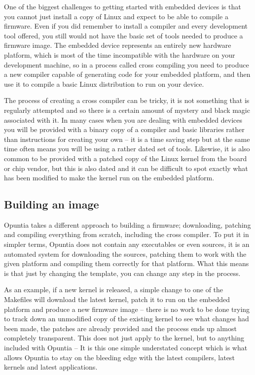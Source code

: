 One of the biggest challenges to getting started with embedded devices is that you
cannot just install a copy of Linux and expect to be able to compile a firmware.
Even if you did remember to install a compiler and every development tool offered,
you still would not have the basic set of tools needed to produce a firmware image.
The embedded device represents an entirely new hardware platform, which is
most of the time incompatible with the hardware on your development machine, so in a process called
cross compiling you need to produce a new compiler capable of generating code for
your embedded platform, and then use it to compile a basic Linux distribution to
run on your device.

The process of creating a cross compiler can be tricky, it is not something that is
regularly attempted and so there is a certain amount of mystery and black magic
associated with it. In many cases when you are dealing with embedded devices you will
be provided with a binary copy of a compiler and basic libraries rather than
instructions for creating your own -- it is a time saving step but at the same time
often means you will be using a rather dated set of tools. Likewise, it is also common
to be provided with a patched copy of the Linux kernel from the board or chip vendor,
but this is also dated and it can be difficult to spot exactly what has been
modified to make the kernel run on the embedded platform.

\subsection{Building an image}

Opuntia takes a different approach to building a firmware; downloading, patching
and compiling everything from scratch, including the cross compiler. To put it
in simpler terms, Opuntia does not contain any executables or even sources, it is an
automated system for downloading the sources, patching them to work with the given
platform and compiling them correctly for that platform. What this means is that
just by changing the template, you can change any step in the process.

As an example, if a new kernel is released, a simple change to one of the Makefiles
will download the latest kernel, patch it to run on the embedded platform and produce
a new firmware image -- there is no work to be done trying to track down an unmodified
copy of the existing kernel to see what changes had been made, the patches are
already provided and the process ends up almost completely transparent. This does not
just apply to the kernel, but to anything included with Opuntia -- It is this one
simple understated concept which is what allows Opuntia to stay on the bleeding edge
with the latest compilers, latest kernels and latest applications.

